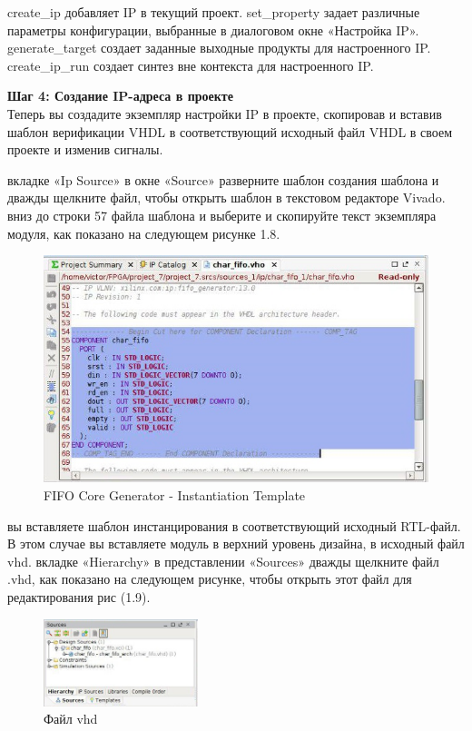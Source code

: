 \begin{itemize}
 create\_ip добавляет IP в текущий проект.
 set\_property задает различные параметры конфигурации, выбранные в диалоговом окне «Настройка IP».
 generate\_target создает заданные выходные продукты для настроенного IP.
 create\_ip\_run создает синтез вне контекста для настроенного IP.
\end{itemize}

\textbf{Шаг 4: Создание IP-адреса в проекте} \\ 
Теперь вы создадите экземпляр настройки IP в проекте, скопировав и вставив шаблон верификации VHDL в соответствующий исходный файл VHDL в своем проекте и изменив сигналы.
\begin{enumerate}
 вкладке «Ip Source»  в окне «Source» разверните шаблон создания шаблона и дважды щелкните файл, чтобы открыть шаблон в текстовом редакторе Vivado.
 вниз до строки 57 файла шаблона и выберите и скопируйте текст экземпляра модуля, как показано на следующем рисунке 1.8.
\begin{figure}[h]
\centering
\includegraphics[width=1.1\textwidth]{fifo_ip_8}
\caption{FIFO Core Generator - Instantiation Template}
\label{fifo_ip_8_label}
\end{figure}
 вы вставляете шаблон инстанцирования в соответствующий исходный RTL-файл. В этом случае вы вставляете модуль в верхний уровень дизайна, в исходный файл vhd.
 вкладке «Hierarchy» в представлении «Sources» дважды щелкните файл .vhd, как показано на следующем рисунке, чтобы открыть этот файл для редактирования рис (1.9).

\begin{figure}[h]
\centering
\includegraphics[width=0.4\textwidth]{fifo_ip_9}
\caption{Файл vhd}
\label{fifo_ip_9_label}
\end{figure}


\end{enumerate}
